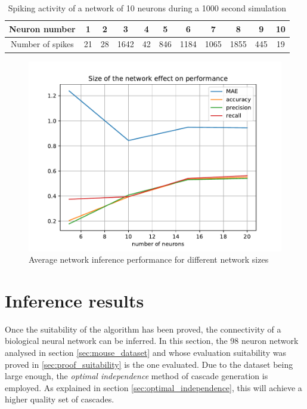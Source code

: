 \begin{table}[]
\centering
\begin{tabular}{|c|c|c|c|c|c|c|c|c|c|c|}
\hline
Neuron number    & 1  & 2  & 3    & 4  & 5   & 6    & 7    & 8    & 9   & 10 \\ \hline
Number of spikes & 21 & 28 & 1642 & 42 & 846 & 1184 & 1065 & 1855 & 445 & 19 \\ \hline
\end{tabular}
\caption{Spiking activity of a network of 10 neurons during a 1000 second simulation}
\label{tab:spiking_activity_10_neurons}
\end{table}


\begin{figure}
	\centering
	\includegraphics[width=0.8\linewidth]{size_effect_performance.pdf}
	\caption{Average network inference performance for different network sizes}
	\label{fig:results_network_sizes}
\end{figure}

\section{Inference results}

Once the suitability of the algorithm has been proved, the connectivity of a biological neural network can be inferred. In this section, the 98 neuron network analysed in section \ref{sec:mouse_dataset} and whose evaluation suitability was proved in \ref{sec:proof_suitability} is the one evaluated. Due to the dataset being large enough, the \textit{optimal independence} method of cascade generation is employed. As explained in section \ref{sec:optimal_independence}, this will achieve a higher quality set of cascades.\\

